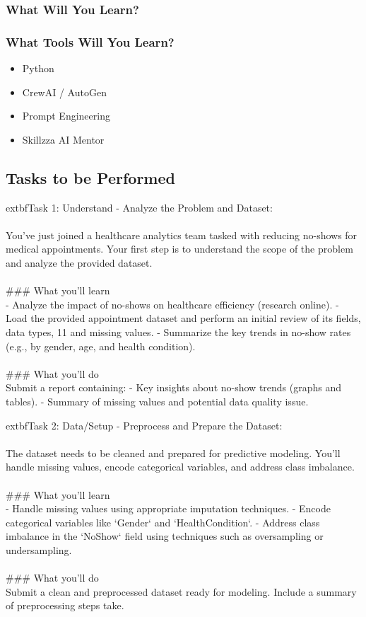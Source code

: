 \documentclass{article}
\begin{document}
\subsubsection*{What Will You Learn?}
\begin{itemize}
\end{itemize}

\subsubsection*{What Tools Will You Learn?}
\begin{itemize}
    \item Python
    \item CrewAI / AutoGen
    \item Prompt Engineering
    \item Skillzza AI Mentor
\end{itemize}

\subsection*{Tasks to be Performed}
	extbf{Task 1:} Understand - Analyze the Problem and Dataset:  \\
 \\
 You’ve just joined a healthcare analytics team tasked with reducing no-shows for medical appointments. Your first step is to understand the scope of the problem and analyze the provided dataset. \\
 \\
### What you'll learn \\
- Analyze the impact of no-shows on healthcare efficiency (research online). - Load the provided appointment dataset and perform an initial review of its fields, data types, 11 and missing values. - Summarize the key trends in no-show rates (e.g., by gender, age, and health condition). \\
 \\
### What you'll do \\
Submit a report containing: - Key insights about no-show trends (graphs and tables). - Summary of missing values and potential data quality issue.

	extbf{Task 2:} Data/Setup - Preprocess and Prepare the Dataset:  \\
 \\
 The dataset needs to be cleaned and prepared for predictive modeling. You’ll handle missing values, encode categorical variables, and address class imbalance. \\
 \\
### What you'll learn \\
- Handle missing values using appropriate imputation techniques. - Encode categorical variables like ‘Gender‘ and ‘HealthCondition‘. - Address class imbalance in the ‘NoShow‘ field using techniques such as oversampling or undersampling. \\
 \\
### What you'll do \\
Submit a clean and preprocessed dataset ready for modeling. Include a summary of preprocessing steps take.
\end{document}

